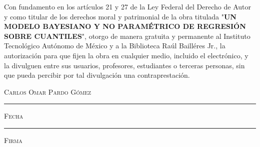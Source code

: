 \thispagestyle{empty}
\vspace*{\fill}
\begingroup
Con fundamento en los art\'iculos 21 y 27 de la Ley Federal del Derecho de Autor y como titular de los derechos moral y patrimonial de la obra titulada "\textbf{UN MODELO BAYESIANO Y NO PARAM\'ETRICO DE REGRESI\'ON SOBRE CUANTILES}", otorgo de manera gratuita y permanente al Instituto Tecnol\'ogico Aut\'onomo de M\'exico y a la Biblioteca Ra\'ul Baill\'eres Jr., la autorizaci\'on para que fijen la obra en cualquier medio, incluido el electr\'onico, y la divulguen entre sus usuarios, profesores, estudiantes o terceras personas, sin que pueda percibir por tal divulgaci\'on una contraprestaci\'on.

\centering

\hspace{3em}

\textsc{Carlos Omar Pardo G\'omez}

\vspace{4em}

\rule[1em]{20em}{0.5pt} %

\textsc{Fecha}
 
\vspace{6em}

\rule[1em]{20em}{0.5pt} %

\textsc{Firma}

\endgroup
\vspace*{\fill}
